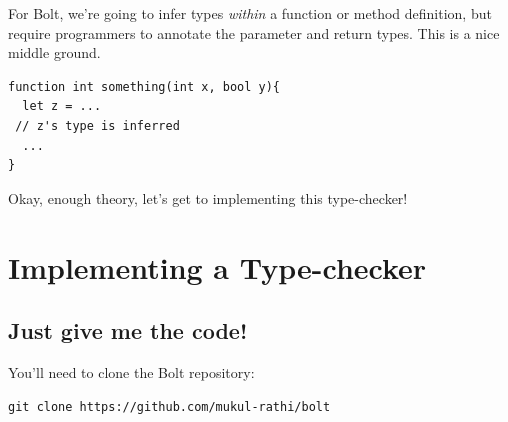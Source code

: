 {{For Bolt, we're going to infer types \emph{within} a function or method
definition, but require programmers to annotate the parameter and return
types. This is a nice middle ground.



\begin{verbatim}
function int something(int x, bool y){
  let z = ...
 // z's type is inferred
  ...
}
\end{verbatim}

Okay, enough theory, let's get to implementing this type-checker!

%
%
%
%

\hypertarget{implementing-a-type-checker}{%
\section{\texorpdfstring{\protect\hyperlink{implementing-a-type-checker}{}Implementing
a
Type-checker}{Implementing a Type-checker}}\label{implementing-a-type-checker}}

\hypertarget{just-give-me-the-code}{%
\subsection{\texorpdfstring{\protect\hyperlink{just-give-me-the-code}{}Just
give me the
code!}{Just give me the code!}}\label{just-give-me-the-code}}

You'll need to clone the Bolt repository:


\begin{verbatim}
git clone https://github.com/mukul-rathi/bolt
\end{verbatim}

}}
